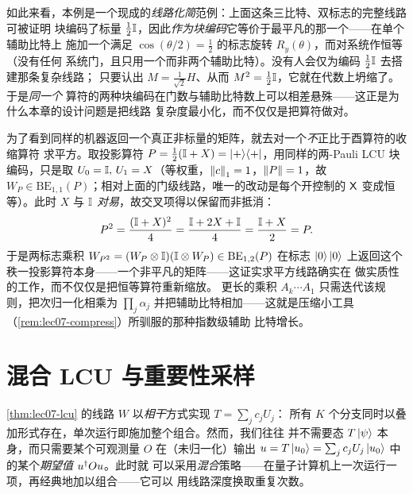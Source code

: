 \begin{example}
如此来看，本例是一个现成的\emph{线路化简}范例：上面这条三比特、双标志的完整线路可被证明
块编码了标量 $\tfrac12\mathbb{I}$，因此\emph{作为块编码}它等价于最平凡的那一个——在单个辅助比特上
施加一个满足 $\cos(\theta/2)=\tfrac12$ 的标志旋转 $R_y(\theta)$，而对系统作恒等（没有任何
系统门，且只用一个而非两个辅助比特）。没有人会仅为编码 $\tfrac12\mathbb{I}$ 去搭建那条复杂线路；
只要认出 $M=\tfrac1{\sqrt2}H$、从而 $M^2=\tfrac12\mathbb{I}$，它就在代数上坍缩了。于是\emph{同一个}
算符的两种块编码在门数与辅助比特数上可以相差悬殊——这正是为什么本章的设计问题是把线路
复杂度最小化，而不仅仅是把算符做对。

为了看到同样的机器返回一个真正非标量的矩阵，就去对一个\emph{不}正比于酉算符的收缩算符
求平方。取投影算符 $P=\tfrac12(\mathbb{I}+X)=\ket{+}\!\bra{+}$，用同样的两-Pauli LCU 块编码，只是取
$U_0=\mathbb{I},\,U_1=X$（等权重，$\left\lVert c \right\rVert_1=1$，$\left\lVert P \right\rVert=1$，故
$W_P\in\mathrm{BE}_{1,1}(P)$；相对上面的门级线路，唯一的改动是每个开控制的 $\mathsf{X}$
变成恒等）。此时 $X$ 与 $\mathbb{I}$ \emph{对易}，故交叉项得以保留而非抵消：
\[
  P^2=\frac{(\mathbb{I}+X)^2}{4}=\frac{\mathbb{I}+2X+\mathbb{I}}{4}=\frac{\mathbb{I}+X}{2}=P.
\]
于是两标志乘积 $W_{P^2}=(W_P\otimes\mathbb{I})(\mathbb{I}\otimes W_P)\in\mathrm{BE}_{1,2}(P)$ 在标志
$\ket0\ket0$ 上返回这个秩一投影算符本身——一个非平凡的矩阵——这证实求平方线路确实在
做实质性的工作，而不仅仅是把恒等算符重新缩放。
更长的乘积 $A_k\cdots A_1$ 只需迭代该规则，把次归一化相乘为 $\prod_j\alpha_j$
并把辅助比特相加——这就是压缩小工具（\cref{rem:lec07-compress}）所驯服的那种指数级辅助
比特增长。
\end{example}
\section{混合 LCU 与重要性采样}
\label{sec:lec07-4}

\cref{thm:lec07-lcu} 的线路 $W$ 以\emph{相干}方式实现 $T=\sum_j c_j U_j$：
所有 $K$ 个分支同时以叠加形式存在，单次运行即施加整个组合。然而，我们往往
并不需要态 $T\ket{\psi}$ 本身，而只需要某个可观测量 $O$ 在（未归一化）输出
$u=T\ket{u_0}=\sum_j c_j U_j\ket{u_0}$ 中的某个\emph{期望值} $u^{\dagger} O u$。此时就
可以采用\emph{混合}策略——在量子计算机上一次运行一项，再经典地加以组合——它可以
用线路深度换取重复次数。

